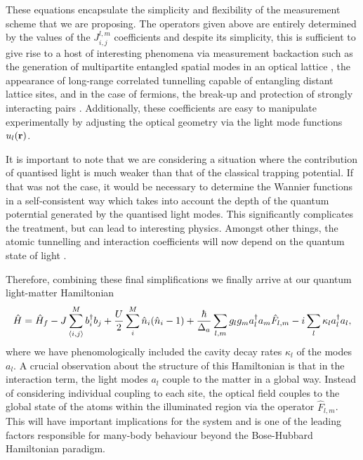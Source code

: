 These equations encapsulate the simplicity and flexibility of the
measurement scheme that we are proposing. The operators given above
are entirely determined by the values of the $J^{l,m}_{i,j}$
coefficients and despite its simplicity, this is sufficient to give
rise to a host of interesting phenomena via measurement backaction
such as the generation of multipartite entangled spatial modes in an
optical lattice \cite{elliott2015, atoms2015, mekhov2009pra}, the
appearance of long-range correlated tunnelling capable of entangling
distant lattice sites, and in the case of fermions, the break-up and
protection of strongly interacting pairs \cite{mazzucchi2016,
  kozlowski2016zeno}. Additionally, these coefficients are easy to
manipulate experimentally by adjusting the optical geometry via the
light mode functions $u_l(\mathbf{r})$.

It is important to note that we are considering a situation where the
contribution of quantised light is much weaker than that of the
classical trapping potential. If that was not the case, it would be
necessary to determine the Wannier functions in a self-consistent way
which takes into account the depth of the quantum poterntial generated
by the quantised light modes. This significantly complicates the
treatment, but can lead to interesting physics. Amongst other things,
the atomic tunnelling and interaction coefficients will now depend on
the quantum state of light \cite{mekhov2008}.  

Therefore, combining these final simplifications we finally arrive at
our quantum light-matter Hamiltonian
\begin{equation}
  \label{eq:fullH}
  \hat{H} = \hat{H}_f -J \sum_{\langle i,j \rangle}^M b^\dagger_i b_j + 
  \frac{U}{2} \sum_{i}^M \hat{n}_i (\hat{n}_i - 1) + 
  \frac{\hbar}{\Delta_a} \sum_{l,m} g_l g_m a^\dagger_l a_m \hat{F}_{l,m} -
  i \sum_l \kappa_l a^\dagger_l a_l,
\end{equation}
where we have phenomologically included the cavity decay rates
$\kappa_l$ of the modes $a_l$. A crucial observation about the
structure of this Hamiltonian is that in the interaction term, the
light modes $a_l$ couple to the matter in a global way. Instead of
considering individual coupling to each site, the optical field
couples to the global state of the atoms within the illuminated region
via the operator $\hat{F}_{l,m}$. This will have important
implications for the system and is one of the leading factors
responsible for many-body behaviour beyond the Bose-Hubbard
Hamiltonian paradigm. 

